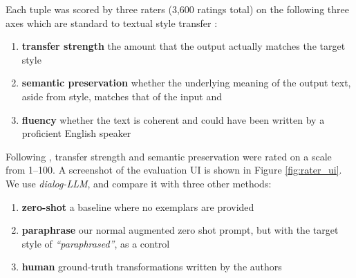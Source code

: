 Each tuple was scored by three raters (3,600 ratings total) on the following three axes which are standard to textual style transfer \citep{DBLP:journals/corr/abs-1904-02295}:

\begin{enumerate}
\item \textbf{transfer strength} the amount that the output actually matches the target style
\item \textbf{semantic preservation} whether the underlying meaning of the output text, aside from style, matches that of the input and
\item \textbf{fluency} whether the text is coherent and could have been written by a proficient English speaker
\end{enumerate}

Following \citet{sakaguchi-van-durme-2018-efficient}, transfer strength and semantic preservation were rated on a scale from 1--100. A screenshot of the evaluation UI is shown in Figure \ref{fig:rater_ui}.
We use \textit{dialog-LLM}, and compare it with three other methods:

\begin{enumerate}
\item \textbf{zero-shot} a baseline where no exemplars are provided
\item \textbf{paraphrase} our normal augmented zero shot prompt, but with the target style of \textit{``paraphrased''}, as a control 
\item \textbf{human} ground-truth transformations written by the authors
\end{enumerate}

